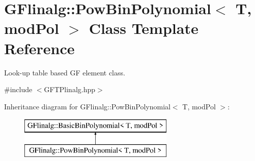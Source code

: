 \hypertarget{class_g_flinalg_1_1_pow_bin_polynomial}{}\section{G\+Flinalg\+::Pow\+Bin\+Polynomial$<$ T, mod\+Pol $>$ Class Template Reference}
\label{class_g_flinalg_1_1_pow_bin_polynomial}


Look-\/up table based GF element class.  




{\ttfamily \#include $<$G\+F\+T\+Plinalg.\+hpp$>$}

Inheritance diagram for G\+Flinalg\+::Pow\+Bin\+Polynomial$<$ T, mod\+Pol $>$\+:\begin{figure}[H]
\begin{center}
\leavevmode
\includegraphics[height=2.000000cm]{class_g_flinalg_1_1_pow_bin_polynomial}
\end{center}
\end{figure}
